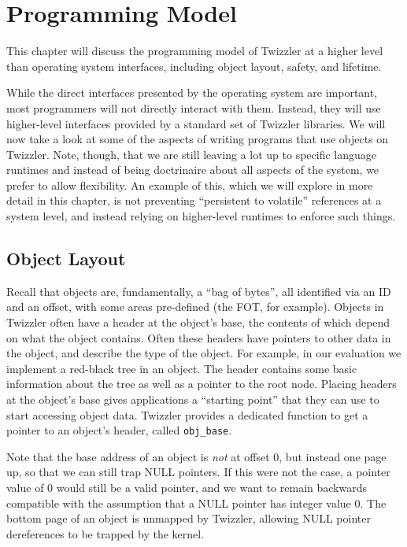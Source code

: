
\chapter{Programming Model}\label{ch:prog}

\begin{chabstract}
    This chapter will discuss the programming model of Twizzler at a higher level than operating system interfaces,
    including object layout, safety, and lifetime.
\end{chabstract}

While the direct interfaces presented by the operating system are important, most programmers will not directly interact
with them. Instead, they will use higher-level interfaces provided by a standard set of Twizzler libraries. We will now
take a look at some of the aspects of writing programs that use objects on Twizzler. Note, though, that we are still
leaving a lot up to specific language runtimes and instead of being doctrinaire about all aspects of the system, we
prefer to allow flexibility. An example of this, which we will explore in more detail in this chapter, is not
preventing ``persistent to volatile'' references at a system level, and instead relying on higher-level runtimes to
enforce such things.

\section{Object Layout}
Recall that objects are, fundamentally, a ``bag of bytes'', all identified via an ID and an offset, with some areas
pre-defined (the FOT, for example).
Objects in Twizzler often have a header at the object's base, the contents of which depend on what
the object contains. Often these headers have pointers to other data in the object, and describe the
type of the object. For example, in our evaluation we implement a red-black tree in an object. The
header contains some basic information about the tree as well as a pointer to the root node. Placing
headers at the object's base gives applications a ``starting point'' that they can use to start
accessing object data. Twizzler provides a dedicated function to get a pointer to an object's
header, called \texttt{obj\_base}.

Note that the base address of an object is \emph{not} at offset 0, but instead one page up, so that we
can still trap NULL pointers. If this were not the case, a pointer value of 0 would still be a valid
pointer, and we want to remain backwards compatible with the assumption that a NULL pointer has
integer value 0. The bottom page of an object is unmapped by Twizzler, allowing NULL pointer
dereferences to be trapped by the kernel.

